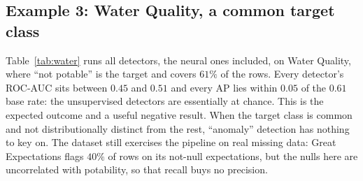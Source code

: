 \documentclass[conference]{IEEEtran}
\begin{document}
\subsection{Example 3: Water Quality, a common target class}
Table~\ref{tab:water} runs all detectors, the neural ones included, on Water Quality, where
``not potable'' is the target and covers $61\%$ of the rows. Every
detector's ROC-AUC sits between $0.45$ and $0.51$ and every AP lies
within $0.05$ of the $0.61$ base rate: the unsupervised detectors are
essentially at chance. This is the expected outcome and a useful negative
result. When the target class is common and not distributionally distinct
from the rest, ``anomaly'' detection has nothing to key on. The dataset
still exercises the pipeline on real missing data: Great Expectations
flags $40\%$ of rows on its not-null expectations, but the nulls here are
uncorrelated with potability, so that recall buys no precision.
\end{document}
